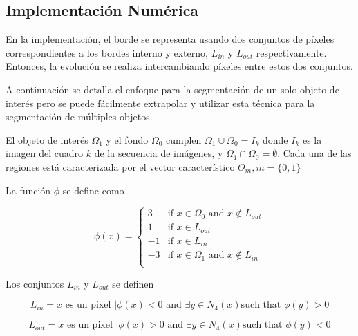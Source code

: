 \documentclass[a4paper,10pt]{article}
\begin{document}
\subsection{Implementación Numérica}

En la implementación, el borde se representa usando dos conjuntos de píxeles correspondientes a los bordes interno y externo, $L_{in}$ y $L_{out}$ respectivamente. 
Entonces, la evolución se realiza intercambiando píxeles entre estos dos conjuntos.

A continuación se detalla el enfoque para la segmentación de un solo objeto de interés pero se puede fácilmente extrapolar y 
utilizar esta técnica para la segmentación de múltiples objetos.


El objeto de interés $\Omega_{1}$ y el fondo $\Omega_{0}$ cumplen $\Omega_{1}\cup\Omega_{0} = I_{k}$ donde $I_{k}$ es la imagen del cuadro $k$ de la secuencia de imágenes, y
$\Omega_{1}\cap\Omega_{0} = \emptyset$. Cada una de las regiones está caracterizada por el vector característico $\Theta_{m}, m = \{0,1\}$

La función $\phi$  se define como

\begin{equation}
\phi(x) =
\left\{
    \begin{array}{ll}
        3  & \mbox{if } x \in \Omega_{0} \mbox{  and  } x \notin L_{out} \\
        1  & \mbox{if } x \in L_{out}\\
        -1  & \mbox{if } x \in L_{in}\\
        -3 & \mbox{if } x \in \Omega_{1} \mbox{  and  } x \notin L_{in} \\
    \end{array}
\right. 
\end{equation}

Los conjuntos $L_{in}$ y $L_{out}$ se definen

\begin{equation}
    L_{in} = {x \mbox{ es un pixel }| \phi(x) < 0 \mbox{ and } \exists y \in N_{4}(x) \mbox{such that } \phi(y) > 0}
\end{equation}

\begin{equation}
    L_{out} = {x \mbox{ es un pixel }| \phi(x) > 0 \mbox{ and } \exists y \in N_{4}(x) \mbox{such that } \phi(y) < 0}
\end{equation}
\end{document}
